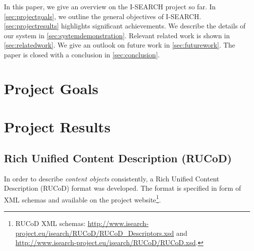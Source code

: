 \documentclass{acm_proc_article-sp}
\let\oldemph\emph
\renewcommand{\emph}[1]{\oldemph{\fontsize{9}{9}\selectfont #1}}
\newcommand{\inlinelistingsize}{\fontsize{8pt}{11pt}}
\let\oldurl\url
\renewcommand{\url}[1]{\inlinelistingsize\oldurl{#1}}
\begin{document}
In this paper, we give an overview on the \mbox{I-SEARCH} project so far.
In \autoref{sec:projectgoals}, we outline the general objectives of  \mbox{I-SEARCH}.
\autoref{sec:projectresults} highlights significant achievements.
We describe the details of our system in \autoref{sec:systemdemonstration}.
Relevant related work is shown in \autoref{sec:relatedwork}.
We give an outlook on future work in \autoref{sec:futurework}.
The paper is closed with a conclusion in \autoref{sec:conclusion}.

\section{Project Goals} \label{sec:projectgoals}


\section{Project Results} \label{sec:projectresults}

\subsection{Rich Unified Content Description (RUCoD)}
In order to describe \emph{content objects} consistently, a Rich Unified Content Description (RUCoD) format was developed.
The format is specified in form of XML schemas and available on the project website\footnote{RUCoD XML schemas: \url{http://www.isearch-project.eu/isearch/RUCoD/RUCoD_Descriptors.xsd} and \url{http://www.isearch-project.eu/isearch/RUCoD/RUCoD.xsd}.}.
\end{document}
